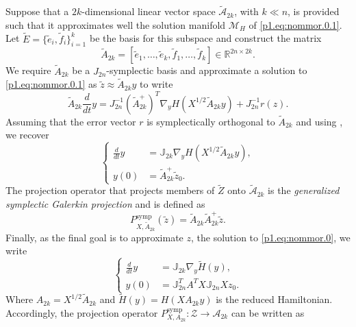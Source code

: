 Suppose that a $2k$-dimensional linear vector space $\tilde{ \mathcal A}_{2k}$, with $k\ll n$, is provided such that it approximates well the solution manifold $\mathcal M_H$ of \eqref{p1.eq:nommor.0.1}. Let $\tilde E = \{ \tilde e_i,\tilde f_i \}_{i=1}^k$ be the basis for this subspace and construct the matrix
\begin{equation} \label{p1.eq:nommor.0.7}
	\tilde A_{2k} = [\tilde e_1,\dots,\tilde e_k,\tilde f_1,\dots,\tilde f_k] \in \mathbb R^{2n\times 2k}.
\end{equation}
We require $\tilde A_{2k}$ be a $J_{2n}$-symplectic basis and approximate a solution to \eqref{p1.eq:nommor.0.1} as $\tilde z \approx \tilde A_{2k} y$ to write
\begin{equation} \label{p1.eq:nommor.0.8}
	\tilde A_{2k} \frac d {dt} y = J^{-1}_{2n} (\tilde A_{2k}^+)^T \nabla_{y} H(X^{1/2}\tilde A_{2k}y) + J^{-1}_{2n} r(z).
\end{equation}
Assuming that the error vector $r$ is symplectically orthogonal to $\tilde A_{2k}$ and using , we recover
\begin{equation}
	\left\{
	\begin{aligned}
		\frac d {dt} y &= \mathbb J_{2k} \nabla_{y} H(X^{1/2}\tilde A_{2k} y), \\
		y(0) &= \tilde A_{2k}^+ \tilde z_0.
	\end{aligned}
	\right.	
\end{equation}
The projection operator that projects members of $\tilde Z$ onto $\tilde {\mathcal A}_{2k}$ is the \emph{generalized symplectic Galerkin projection} and is defined as
\begin{equation} \label{p1.eq:nommor.0.9}
	P_{X,\tilde A_{2k}}^{\text{symp}}(\tilde z) = \tilde A_{2k} \tilde A_{2k}^+ \tilde z.
\end{equation}
Finally, as the final goal is to approximate $z$, the solution to \eqref{p1.eq:nommor.0}, we write
\begin{equation} \label{p1.eq:nommor.0.10}
	\left\{
	\begin{aligned}
		\frac{d}{dt} y &= \mathbb J_{2k} \nabla_y \tilde H(y), \\
		y(0) &= \mathbb J_{2n}^T A^T X \mathbb J_{2n} X z_0.
	\end{aligned}
	\right.	
\end{equation}
Where $A_{2k} = X^{1/2} \tilde A_{2k}$ and $\tilde H(y) = H(XA_{2k}y)$ is the reduced Hamiltonian. Accordingly, the projection operator $P_{X,A_{2k}}^\text{symp}:\mathcal Z\to \mathcal A_{2k}$ can be written as
